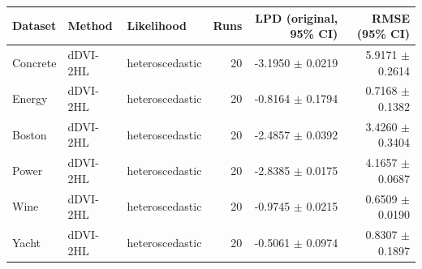 \begin{tabular}{lllrrr}
\toprule
Dataset & Method & Likelihood & Runs & LPD (original, 95\% CI) & RMSE (95\% CI) \\
\midrule
Concrete & dDVI-2HL & heteroscedastic & 20 & -3.1950 $\pm$ 0.0219 & 5.9171 $\pm$ 0.2614 \\
Energy & dDVI-2HL & heteroscedastic & 20 & -0.8164 $\pm$ 0.1794 & 0.7168 $\pm$ 0.1382 \\
Boston & dDVI-2HL & heteroscedastic & 20 & -2.4857 $\pm$ 0.0392 & 3.4260 $\pm$ 0.3404 \\
Power & dDVI-2HL & heteroscedastic & 20 & -2.8385 $\pm$ 0.0175 & 4.1657 $\pm$ 0.0687 \\
Wine & dDVI-2HL & heteroscedastic & 20 & -0.9745 $\pm$ 0.0215 & 0.6509 $\pm$ 0.0190 \\
Yacht & dDVI-2HL & heteroscedastic & 20 & -0.5061 $\pm$ 0.0974 & 0.8307 $\pm$ 0.1897 \\
\bottomrule
\end{tabular}
